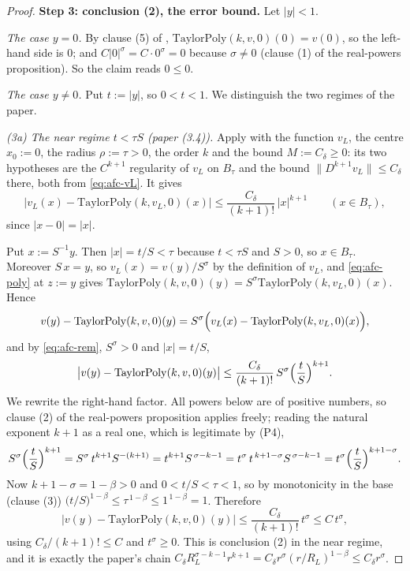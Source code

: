 \begin{proof}
\medskip\noindent\textbf{Step 3: conclusion (2), the error bound.}
Let $\lvert y\rvert<1$.

\emph{The case $y=0$.}  By clause (5) of ,
$\mathrm{TaylorPoly}(k,v,0)(0)=v(0)$, so the left-hand side is $0$; and
$C\lvert0\rvert^{\sigma}=C\cdot0^{\sigma}=0$ because $\sigma\ne0$ (clause (1) of the
real-powers proposition).  So the claim reads $0\le0$.

\emph{The case $y\ne0$.}  Put $t:=\lvert y\rvert$, so $0<t<1$.  We distinguish the two regimes
of the paper.

\emph{(3a) The near regime $t<\tau S$ (paper (3.4)).}  Apply  with
the function $v_L$, the centre $x_0:=0$, the radius $\rho:=\tau>0$, the order $k$ and the bound
$M:=C_\delta\ge0$: its two hypotheses are the $C^{k+1}$ regularity of $v_L$ on $B_\tau$ and the
bound $\lVert D^{k+1}v_L\rVert\le C_\delta$ there, both from \eqref{eq:afc-vL}.  It gives
\begin{equation}\label{eq:afc-rem}
  \bigl\lvert v_L(x)-\mathrm{TaylorPoly}(k,v_L,0)(x)\bigr\rvert
  \le\frac{C_\delta}{(k+1)!}\,\lvert x\rvert^{k+1}\qquad(x\in B_\tau),
\end{equation}
since $\lvert x-0\rvert=\lvert x\rvert$.

Put $x:=S^{-1}y$.  Then $\lvert x\rvert=t/S<\tau$ because $t<\tau S$ and $S>0$, so
$x\in B_\tau$.  Moreover $S\,x=y$, so $v_L(x)=v(y)/S^{\sigma}$ by the definition of $v_L$, and
\eqref{eq:afc-poly} at $z:=y$ gives
$\mathrm{TaylorPoly}(k,v,0)(y)=S^{\sigma}\mathrm{TaylorPoly}(k,v_L,0)(x)$.  Hence
\[
  v(y)-\mathrm{TaylorPoly}(k,v,0)(y)
  =S^{\sigma}\Bigl(v_L(x)-\mathrm{TaylorPoly}(k,v_L,0)(x)\Bigr),
\]
and by \eqref{eq:afc-rem}, $S^{\sigma}>0$ and $\lvert x\rvert=t/S$,
\[
  \bigl\lvert v(y)-\mathrm{TaylorPoly}(k,v,0)(y)\bigr\rvert
  \le\frac{C_\delta}{(k+1)!}\,S^{\sigma}\Bigl(\frac{t}{S}\Bigr)^{k+1}.
\]
We rewrite the right-hand factor.  All powers below are of positive numbers, so clause (2) of
the real-powers proposition applies freely; reading the natural exponent $k+1$ as a real one,
which is legitimate by (P4),
\[
  S^{\sigma}\Bigl(\frac{t}{S}\Bigr)^{k+1}
  =S^{\sigma}\,t^{k+1}S^{-(k+1)}=t^{k+1}S^{\,\sigma-k-1}
  =t^{\sigma}\,t^{\,k+1-\sigma}S^{\,\sigma-k-1}
  =t^{\sigma}\Bigl(\frac{t}{S}\Bigr)^{k+1-\sigma}.
\]
Now $k+1-\sigma=1-\beta>0$ and $0<t/S<\tau<1$, so by monotonicity in the base (clause (3))
$\bigl(t/S\bigr)^{1-\beta}\le\tau^{\,1-\beta}\le1^{\,1-\beta}=1$.  Therefore
\[
  \bigl\lvert v(y)-\mathrm{TaylorPoly}(k,v,0)(y)\bigr\rvert
  \le\frac{C_\delta}{(k+1)!}\,t^{\sigma}\le C\,t^{\sigma},
\]
using $C_\delta/(k+1)!\le C$ and $t^{\sigma}\ge0$.  This is conclusion (2) in the near regime,
and it is exactly the paper's chain
$C_\delta R_L^{\sigma-k-1}r^{k+1}=C_\delta r^{\sigma}(r/R_L)^{1-\beta}\le C_\delta r^{\sigma}$.


\end{proof}
